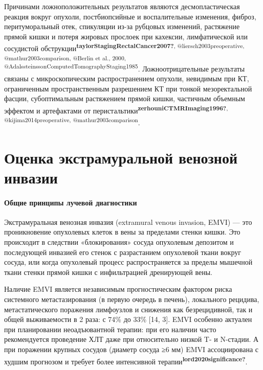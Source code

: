 \documentclass[
  russian,
  12pt,
  a4paper,
]{report}
\begin{document}
Причинами ложноположительных результатов являются десмопластическая
реакция вокруг опухоли, постбиопсийные и воспалительные изменения,
фиброз, перитуморальный отек, спикуляции из-за рубцовых изменений,
растяжение прямой кишки и потеря жировых прослоек при кахексии,
лимфатической или сосудистой
обструкции\textsuperscript{\textbf{taylorStagingRectalCancer2007?},
@liersch2003preoperative, @mathur2003comparison, @Berlin et al., 2000,
@AdalssteinssonComputedTomographyStaging1985}. Ложноотрицательные
результаты связаны с микроскопическим распространением опухоли,
невидимым при КТ, ограниченным пространственным разрешением КТ при
тонкой мезоректальной фасции, субоптимальным растяжением прямой кишки,
частичным объемным эффектом и артефактами от
перистальтики\textsuperscript{\textbf{zerhouniCTMRImaging1996?},
@kijima2014preoperative, @mathur2003comparison}.

\chapter{Оценка экстрамуральной венозной
инвазии}\label{ux43eux446ux435ux43dux43aux430-ux44dux43aux441ux442ux440ux430ux43cux443ux440ux430ux43bux44cux43dux43eux439-ux432ux435ux43dux43eux437ux43dux43eux439-ux438ux43dux432ux430ux437ux438ux438}

\subsubsection{Общие принципы лучевой
диагностики}\label{ux43eux431ux449ux438ux435-ux43fux440ux438ux43dux446ux438ux43fux44b-ux43bux443ux447ux435ux432ux43eux439-ux434ux438ux430ux433ux43dux43eux441ux442ux438ux43aux438-4}

Экстрамуральная венозная инвазия (extramural venous invasion, EMVI) ---
это проникновение опухолевых клеток в вены за пределами стенки кишки.
Это происходит в следствии «блокирования» сосуда опухолевым депозитом и
последующей инвазией его стенок с разрастанием опухолевой ткани вокруг
сосуда, или когда опухолевый процесс распространяется за пределы
мышечной ткани стенки прямой кишки с инфильтрацией дренирующей вены.

Наличие EMVI является независимым прогностическим фактором риска
системного метастазирования (в первую очередь в печень), локального
рецидива, метастатического поражения лимфоузлов и снижения как
безрецидивной, так и общей выживаемости в 2 раза: с 74\% до 33\% {[}14,
3{]}. EMVI особенно актуален при планировании неоадъювантной терапии:
при его наличии часто рекомендуется проведение ХЛТ даже при относительно
низкой T- и N-стадии. А при поражении крупных сосудов (диаметр сосуда ≥6
мм) EMVI ассоциирована с худшим прогнозом и требует более интенсивной
терапии\textsuperscript{\textbf{lord2020significance?}}.
\end{document}
